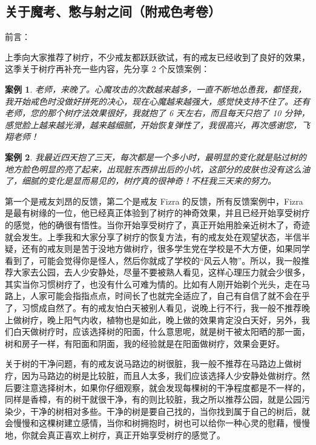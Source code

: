\documentclass[fontset=founder]{ctexart}
\newtheorem{case}{案例}
\begin{document}
\subsection{关于魔考、憋与射之间（附戒色考卷）}

前言：

上季向大家推荐了树疗，不少戒友都跃跃欲试，有的戒友已经收到了良好的效果，这季关于树疗再补充一些内容，先分享 2 个反馈案例：

\begin{case}
    老师，来晚了。心魔攻击的次数越来越多，一直不断地怂恿我，都怪我，我开始戒色时没做好拼死的决心，现在心魔越来越强大，感觉快支持不住了。还有老师，您的那个树疗法效果很好，我就抱了 6 天左右，而且每天只抱了 10 分钟，感觉脸上越来越光滑，越来越细腻，开始恢复弹性了，我很高兴，再次感谢您，飞翔老师！
\end{case}

\begin{case}
    我最近四天抱了三天，每次都是一个多小时，最明显的变化就是贴过树的地方脸色明显的亮了起来，出现脏东西排出后的小坑，这部分的皮肤也没有这么油了，细腻的变化是显而易见的，树疗真的很神奇！不枉我三天来的努力。
\end{case}

第一个是戒友刘昂的反馈，第二个是戒友 Fizra 的反馈，所有反馈案例中，Fizra 是最有树缘的一位，他已经真正体验到了树疗的神奇效果，并且已经开始享受树疗的感觉，他的确很有悟性。当你开始享受树疗了，真正开始用脸亲近树木了，奇迹就会发生。上季我和大家分享了树疗的恢复方法，有的戒友处在观望状态，半信半疑，还有的戒友则是苦于没地方做树疗，很多学生党在学校是不大方便，如果同学看到了，可能会觉得你是怪人，然后你就成了学校的“风云人物”。所以，我一般推荐大家去公园，去人少安静处，尽量不要被熟人看见，这样心理压力就会少很多，其实当你习惯树疗了，也没有什么可难为情的。比如有人刚开始剃个光头，走在马路上，人家可能会指指点点，时间长了也就完全适应了，自己有自信了就不会在乎了，习惯成自然了。有的戒友怕白天被别人看见，说晚上行不行，我一般不推荐晚上做树疗，晚上阳气内收，植物也是如此，晚上做的效果肯定没白天好，另外，我们白天做树疗时，应该选择树的阳面，什么意思呢，就是树干被太阳晒的那一面，树和房子一样，有阳面和阴面，我的经验就是在阳面做树疗，效果会更好。

关于树的干净问题，有的戒友说马路边的树很脏，我一般不推荐在马路边上做树疗，因为马路边的树是比较脏，而且人太多，我们应该选择人少安静处做树疗。然后要注意选择树木，如果你仔细观察，就会发现每棵树的干净程度都是不一样的，同样是香樟，有的树干就很干净，有的则比较脏，我之所以推荐公园，就是公园污染少，干净的树相对多些。干净的树是要自己找的，当你找到属于自己的树后，就会慢慢和这棵树建立感情，当你和树拥抱时，树也可以给你一种心灵的慰藉，慢慢地，你就会真正喜欢上树疗，真正开始享受树疗的感觉了。
\end{document}
